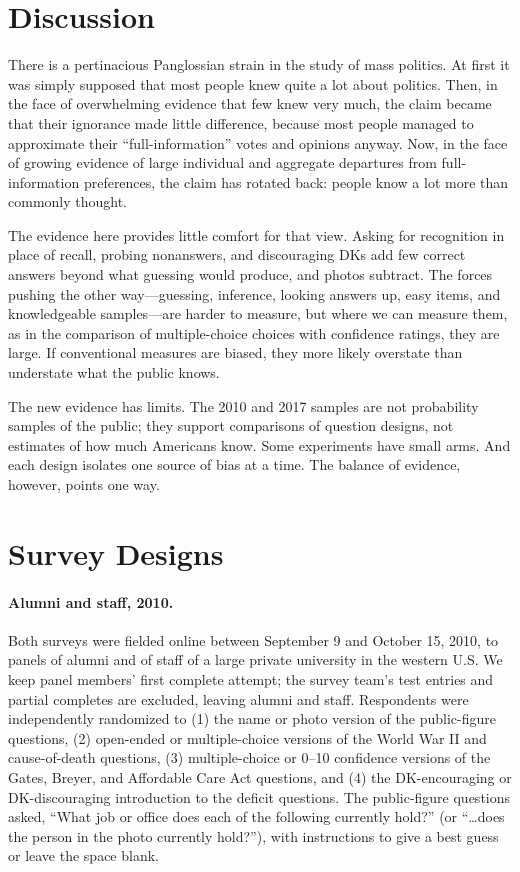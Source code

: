 \documentclass[11pt]{article}
\begin{document}
\section{Discussion}

There is a pertinacious Panglossian strain in the study of mass politics. At first it was simply supposed that most people knew quite a lot about politics. Then, in the face of overwhelming evidence that few knew very much, the claim became that their ignorance made little difference, because most people managed to approximate their ``full-information'' votes and opinions anyway. Now, in the face of growing evidence of large individual and aggregate departures from full-information preferences, the claim has rotated back: people know a lot more than commonly thought.

The evidence here provides little comfort for that view. Asking for recognition in place of recall, probing nonanswers, and discouraging DKs add few correct answers beyond what guessing would produce, and photos subtract. The forces pushing the other way---guessing, inference, looking answers up, easy items, and knowledgeable samples---are harder to measure, but where we can measure them, as in the comparison of multiple-choice choices with confidence ratings, they are large. If conventional measures are biased, they more likely overstate than understate what the public knows.

The new evidence has limits. The 2010 and 2017 samples are not probability samples of the public; they support comparisons of question designs, not estimates of how much Americans know. Some experiments have small arms. And each design isolates one source of bias at a time. The balance of evidence, however, points one way.




\appendix
\section{Survey Designs}

\paragraph{Alumni and staff, 2010.} Both surveys were fielded online between September 9 and October 15, 2010, to panels of alumni and of staff of a large private university in the western U.S. We keep panel members' first complete attempt; the survey team's test entries and partial completes are excluded, leaving \nAlumni{} alumni and \nStaff{} staff. Respondents were independently randomized to (1) the name or photo version of the public-figure questions, (2) open-ended or multiple-choice versions of the World War II and cause-of-death questions, (3) multiple-choice or 0--10 confidence versions of the Gates, Breyer, and Affordable Care Act questions, and (4) the DK-encouraging or DK-discouraging introduction to the deficit questions. The public-figure questions asked, ``What job or office does each of the following currently hold?'' (or ``\ldots does the person in the photo currently hold?''), with instructions to give a best guess or leave the space blank.
\end{document}
